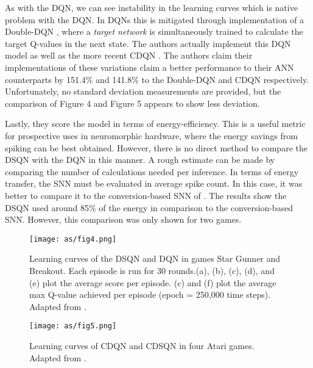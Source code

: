 \documentclass[journal,onecolumn]{IEEEtran}
\begin{document}
As with the DQN, we can see instability in the learning curves which is
native problem with the DQN. In DQNs this is mitigated through
implementation of a Double-DQN
\autocite{wengTianshouHighlyModularized2022} , where a
\emph{target network} is simultaneously trained to calculate the target
Q-values in the next state. The authors actually implement this DQN
model as well as the more recent CDQN
\autocite{wangConvergentEfficientDeep2022}. The authors claim
their implementations of these variations claim a better performance to
their ANN counterparts by 151.4\% and 141.8\% to the Double-DQN and CDQN
respectively. Unfortunately, no standard deviation measurements are
provided, but the comparison of Figure 4 and Figure 5 appears to
show less deviation.

Lastly, they score the model in terms of energy-efficiency. This is a
useful metric for prospective uses in neuromorphic hardware, where the
energy savings from spiking can be best obtained. However, there is no
direct method to compare the DSQN with the DQN in this manner. A rough estimate can be
made by comparing the number of calculations needed per inference. In
terms of energy transfer, the SNN must be evaluated in average spike
count. In this case, it was better to compare it to the conversion-based
SNN of \autocite{tanStrategyBenchmarkConverting2020}. The results show
the DSQN used around 85\% of the energy in comparison to the
conversion-based SNN. However, this comparison was only shown for two
games.

\begin{figure}
\centering
\texttt{[image: as/fig4.png]}
\caption{Learning curves of the DSQN and DQN in games Star Gunner and Breakout. Each episode is run for 30 rounds.(a), (b), (c), (d), and (e) plot the average score per episode. (c) and (f) plot the average max Q-value achieved per episode (epoch = 250,000 time steps). Adapted from \autocite{liuHumanLevelControlDirectly2022}.
}
\label{fig_4}
\end{figure}

\begin{figure}
\centering
\texttt{[image: as/fig5.png]}
\caption{Learning curves of CDQN and CDSQN in four Atari games. Adapted from \autocite{liuHumanLevelControlDirectly2022}.
}
\label{fig_5}
\end{figure}

\end{document}
